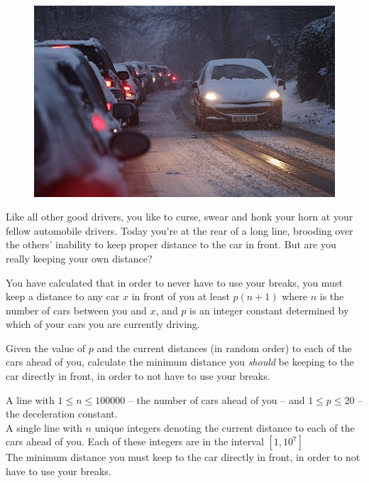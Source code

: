 
\begin{figure}
\vspace{-5mm}
\includegraphics[width=\linewidth,keepaspectratio=true]{driving/driving}
\vspace{-9mm}
\end{figure}

\noindent
Like all other good drivers, you like to curse, swear and honk your horn at your fellow automobile drivers. Today you're at the rear of a long line, brooding over the others' inability to keep proper distance to the car in front. But are you really keeping your own distance?

You have calculated that in order to never have to use your breaks, you must keep a distance to any car $x$ in front of you at least $p(n+1)$ where $n$ is the number of cars between you and $x$, and $p$ is an integer constant determined by which of your cars you are currently driving. 

Given the value of $p$ and the current distances (in random order) to each of the cars ahead of you, calculate the minimum distance you \textit{should} be keeping to the car directly in front, in order to not have to use your breaks.

\Input
A line with $1 \leq n \leq 100000$ -- the number of cars ahead of you -- and $1 \leq p \leq 20$ -- the deceleration constant.\\
A single line with $n$ unique integers denoting the current distance to each of the cars ahead of you. Each of these integers are in the interval $[1, 10^7]$\\

\Output
The minimum distance you must keep to the car directly in front, in order to not have to use your breaks.\\


